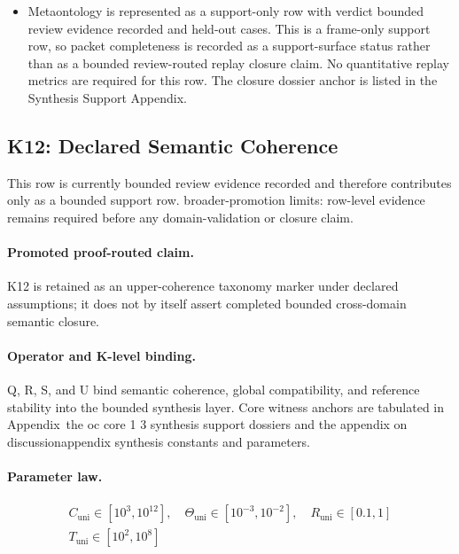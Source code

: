 \begin{itemize}[leftmargin=1.6em,nosep]
\item Metaontology is represented as a support-only row with verdict bounded review evidence recorded and  held-out cases. This is a frame-only support row, so packet completeness is recorded as a support-surface status rather than as a bounded review-routed replay closure claim. No quantitative replay metrics are required for this row. The closure dossier anchor is listed in the Synthesis Support Appendix.
\end{itemize}

\subsection{K12: Declared Semantic Coherence}
\label{sec:oc-core-1-3-synthesis-k12}
This row is currently bounded review evidence recorded and therefore contributes only as a bounded support row.
broader-promotion limits: row-level evidence remains required before any domain-validation or closure claim.

\paragraph{Promoted proof-routed claim.}
K12 is retained as an upper-coherence taxonomy marker under declared assumptions; it does not by itself assert completed bounded cross-domain semantic closure.

\paragraph{Operator and K-level binding.}
Q, R, S, and U bind semantic coherence, global compatibility, and reference stability into the bounded synthesis layer.
Core witness anchors are tabulated in Appendix~the oc core 1 3 synthesis support dossiers and the appendix on discussionappendix synthesis constants and parameters.

\paragraph{Parameter law.}
\[
\begin{gathered} C_{\mathrm{uni}} \in [10^3,10^{12}],\quad \Theta_{\mathrm{uni}} \in [10^{-3},10^{-2}],\quad R_{\mathrm{uni}} \in [0.1,1] \\ T_{\mathrm{uni}} \in [10^2,10^8] \end{gathered}
\]

